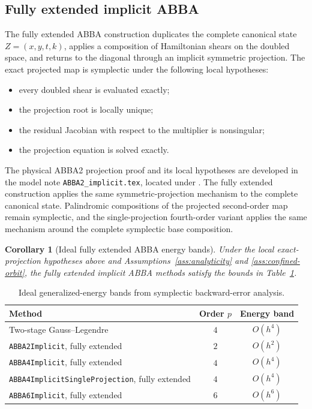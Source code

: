 \documentclass[11pt,a4paper]{article}
\newtheorem{corollary}[theorem]{Corollary}
\theoremstyle{definition}
\theoremstyle{remark}
\begin{document}
\subsection{Fully extended implicit ABBA}

The fully extended ABBA construction duplicates the complete canonical state
$Z=(x,y,t,k)$, applies a composition of Hamiltonian shears on the doubled
space, and returns to the diagonal through an implicit symmetric projection.
The exact projected map is symplectic under the following local hypotheses:
\begin{itemize}
 \item every doubled shear is evaluated exactly;
 \item the projection root is locally unique;
 \item the residual Jacobian with respect to the multiplier is nonsingular;
 \item the projection equation is solved exactly.
\end{itemize}
The physical ABBA2 projection proof and its local hypotheses are developed in
the model note \texttt{ABBA2\_implicit.tex}, located under
.  The fully extended construction applies
the same symmetric-projection mechanism to the complete canonical state.
Palindromic compositions of the projected second-order map remain symplectic,
and the single-projection fourth-order variant applies the same mechanism
around the complete symplectic base composition.

\begin{corollary}[Ideal fully extended ABBA energy bands]
\label{cor:abba-energy-bands}
Under the local exact-projection hypotheses above and
Assumptions~\ref{ass:analyticity} and \ref{ass:confined-orbit}, the fully
extended implicit ABBA methods satisfy the bounds in Table~\ref{tab:energy-bands}.
\end{corollary}

\begin{table}[ht]
 \centering
 \caption{Ideal generalized-energy bands from symplectic backward-error analysis.}
 \label{tab:energy-bands}
 \begin{tabular}{@{}lcc@{}}
  \toprule
  Method & Order $p$ & Energy band \\
  \midrule
  Two-stage Gauss--Legendre & $4$ & $O(h^4)$ \\
  \texttt{ABBA2Implicit}, fully extended & $2$ & $O(h^2)$ \\
  \texttt{ABBA4Implicit}, fully extended & $4$ & $O(h^4)$ \\
  \texttt{ABBA4ImplicitSingleProjection}, fully extended & $4$ & $O(h^4)$ \\
  \texttt{ABBA6Implicit}, fully extended & $6$ & $O(h^6)$ \\
  \bottomrule
 \end{tabular}
\end{table}
\end{document}
